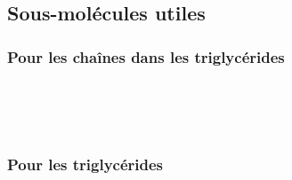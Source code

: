 \begin{boiteCodeTex}{}
  \chemfig{!\cholesterol}
\end{boiteCodeTex}

\subsection{Sous-molécules utiles}
  
\subsubsection{Pour les chaînes dans les triglycérides}

\begin{boiteCodeTex}{}
  \chemfig{[:-30] !\tricaproique}
  \chemfig{[:-30] !\trilaurique} \\
  \chemfig{[:-30] !\tripalmitique}
  \chemfig{[:-30] !\trioleique} \\
  \chemfig{[:-30] !\trilinoleique}
  \chemfig{[:-30] !\trilinolenique} \\
  \chemfig{[:-30] !\trieicosapenta}
  \chemfig{[:-30] !\triarachidonique}
  \chemfig{[:-30] !\tridocosahexa}
\end{boiteCodeTex}
  
\subsubsection{Pour les triglycérides}

\begin{boiteCodeTex}{}
   \\
  \chemfig[atom sep = 14pt]{!\triester {!\trioleique} {!\tricaproique} {!\trilinolenique}}
  \chemfig[atom sep = 14pt]{!\triesterSat {!\lb !\trioleique} {!\tripalmitique} !\lb !\trilaurique}
\end{boiteCodeTex}
